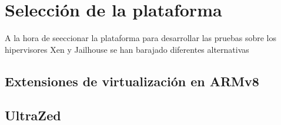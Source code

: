 \chapter{Selección de la plataforma}

A la hora de seeccionar la plataforma para desarrollar las pruebas sobre los hipervisores Xen y Jailhouse se han barajado diferentes alternativas

\section{Extensiones de virtualización en ARMv8}

\section{UltraZed}
